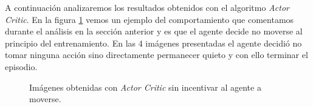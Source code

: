 A continuación analizaremos los resultados obtenidos con el algoritmo \textit{Actor Critic}. En la figura \ref{fig-resultados-experimentos-actor-critic-no-movement} vemos un ejemplo del comportamiento que comentamos durante el análisis en la sección anterior y es que el agente decide no moverse al principio del entrenamiento. En las 4 imágenes presentadas el agente decidió no tomar ninguna acción sino directamente permanecer quieto y con ello terminar el episodio.
\medskip

\begin{figure}[ht!]
    \centering
	\hspace{0.05\linewidth}
	\hspace{0.05\linewidth}
	\hspace{0.05\linewidth}
    \caption[Imágenes obtenidas con \textit{Actor Critic} sin incentivar al agente a moverse]{Imágenes obtenidas con \textit{Actor Critic} sin incentivar al agente a moverse.}
    \label{fig-resultados-experimentos-actor-critic-no-movement}
\end{figure}

